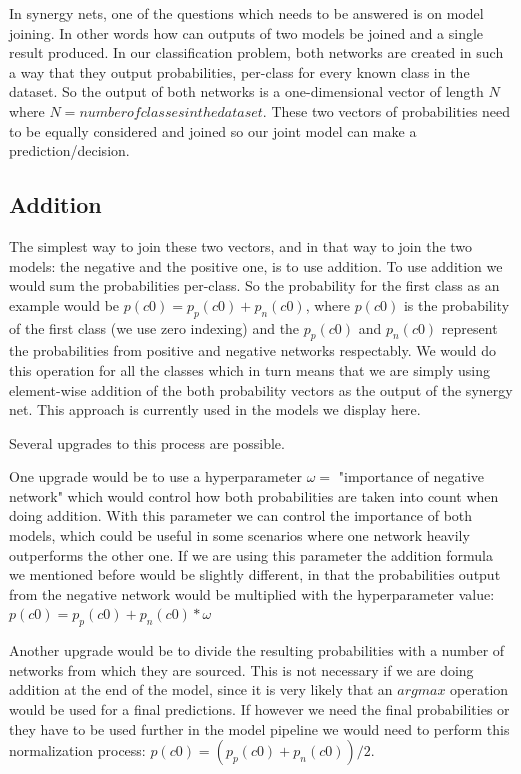 \documentclass[b5paper]{book}
\begin{document}
In synergy nets, one of the questions which needs to be answered is on model joining. In other words how can outputs of two models be joined and a single result produced. In our classification problem, both networks are created in such a way that they output probabilities, per-class for every known class in the dataset. So the output of both networks is a one-dimensional vector of length \( N \) where \( N = number of classes in the dataset \). These two vectors of probabilities need to be equally considered and joined so our joint model can make a prediction/decision.

\subsection{Addition}

The simplest way to join these two vectors, and in that way to join the two models: the negative and the positive one, is to use addition. To use addition we would sum the probabilities per-class. So the probability for the first class as an example would be \( p(c0) = p_p(c0) + p_n(c0) \), where \( p(c0) \) is the probability of the first class (we use zero indexing) and the \(p_p(c0)\) and \(p_n(c0)\) represent the probabilities from positive and negative networks respectably. We would do this operation for all the classes which in turn means that we are simply using element-wise addition of the both probability vectors as the output of the synergy net. This approach is currently used in the models we display here.

Several upgrades to this process are possible.

One upgrade would be to use a hyperparameter \( \omega = \) "importance of negative network"  which would control how both probabilities are taken into count when doing addition. With this parameter we can control the importance of both models, which could be useful in some scenarios where one network heavily outperforms the other one. If we are using this parameter the addition formula we mentioned before would be slightly different, in that the probabilities output from the negative network would be multiplied with the hyperparameter value: \( p(c0) = p_p(c0) + p_n(c0) * \omega \)

Another upgrade would be to divide the resulting probabilities with a number of networks from which they are sourced. This is not necessary if we are doing addition at the end of the model, since it is very likely that an \( argmax \) operation would be used for a final predictions. If however we need the final probabilities or they have to be used further in the model pipeline we would need to perform this normalization process: \( p(c0) = (p_p(c0) + p_n(c0)) / 2 \).
\end{document}
